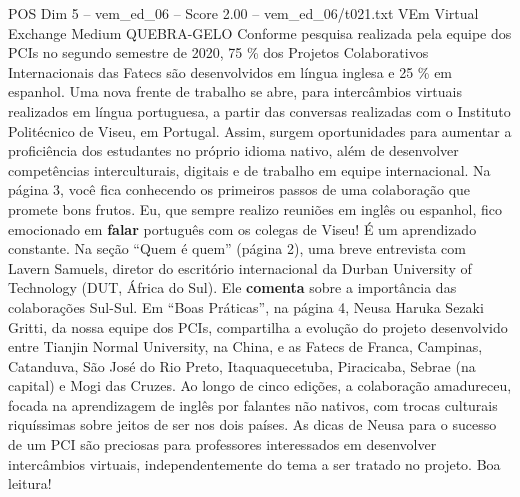 \begin{textsample}{POS Dim 5 – vem\_ed\_06 – Score 2.00 – vem\_ed\_06/t021.txt}  \label{ex:f5_pos_084}
VEm Virtual Exchange Medium QUEBRA-GELO Conforme pesquisa realizada pela equipe dos PCIs no segundo semestre de 2020, 75 \% dos Projetos Colaborativos Internacionais das Fatecs são desenvolvidos em língua inglesa e 25 \% em espanhol.
Uma nova frente de trabalho se abre, para intercâmbios virtuais realizados em língua portuguesa, a partir das conversas realizadas com o Instituto Politécnico de Viseu, em Portugal.
Assim, surgem oportunidades para aumentar a proficiência dos estudantes no próprio idioma nativo, além de desenvolver competências interculturais, digitais e de trabalho em equipe internacional.
Na página 3, você fica conhecendo os primeiros passos de uma colaboração que promete bons frutos.
Eu, que sempre realizo reuniões em inglês ou espanhol, fico emocionado em \textbf{falar} português com os colegas de Viseu!
É um aprendizado constante.
Na seção “Quem é quem” (página 2), uma breve entrevista com Lavern Samuels, diretor do escritório internacional da Durban University of Technology (DUT, África do Sul).
Ele \textbf{comenta} sobre a importância das colaborações Sul-Sul.
Em “Boas Práticas”, na página 4, Neusa Haruka Sezaki Gritti, da nossa equipe dos PCIs, compartilha a evolução do projeto desenvolvido entre Tianjin Normal University, na China, e as Fatecs de Franca, Campinas, Catanduva, São José do Rio Preto, Itaquaquecetuba, Piracicaba, Sebrae (na capital) e Mogi das Cruzes.
Ao longo de cinco edições, a colaboração amadureceu, focada na aprendizagem de inglês por falantes não nativos, com trocas culturais riquíssimas sobre jeitos de ser nos dois países.
As dicas de Neusa para o sucesso de um PCI são preciosas para professores interessados em desenvolver intercâmbios virtuais, independentemente do tema a ser tratado no projeto.
Boa leitura!

\end{textsample}
